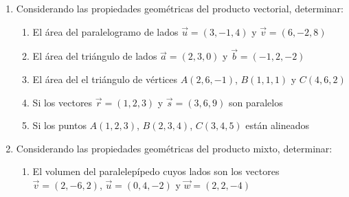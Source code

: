 \documentclass[a4paper]{article}
\newcommand{\exercise}{\item}
\newcommand{\SEL}[1]{ \left\{\begin{matrix} #1 \end{matrix}\right. }
\newcommand{\df}[2]{\displaystyle\frac{#1}{#2}}
\newcommand{\vect}[1]{\overrightarrow{#1}}
\newcommand{\degs}{^{\circ}}
\begin{document}
\begin{enumerate}
\begin{enumerate} [label=(\alph*)]
		\item La proyección vectorial y el componente ortogonal de $(-1,3)$ en la dirección de $(5,-1)$
		\item La proyección vectorial y el componente ortogonal de $\vec{r}=(-1,3)$ sobre $\vec{s}=(3,1)$
		\item La proyección vectorial y escalar de $\vec{v}=(1,5,1)$ en la dirección de $\vec{u}=(-1,2,3)$
		\item La proyección escalar y el módulo del componente ortogonal $\vect{F}=(7,-13)$ sobre $\check{\imath}$
		\item La proyección vectorial de $\vec{a} \in \mathbb{R}^2: \SEL{|\vec{a}|=9 \\ \theta=120\degs}$ sobre $\vec{b} \in \mathbb{R}^2: \SEL{|\vec{b}|=5 \\ \theta=0\degs}$
		\item La proyección vectorial, escalar, el componente ortogonal y su módulo del vector $\vec{v}=(1,2,3)$ en la dirección del vector $\vect{AB}$, con $A(0,-1,4)$ y $B(2,2,3)$
		\item La proyección vectorial y escalar de $\vec{v}=(6,2)$ en la dirección de la recta $y=\df{1}{3}x+5$
		\item La proyección vectorial y su módulo del vector $\vect{AB}$ en la dirección de $\vect{AC}$ considerando $A(-1,3)$, $B(1,2)$ y $C(5,4)$.
	\end{enumerate}
	\exercise Considerando las propiedades geométricas del producto vectorial, determinar:
	\begin{enumerate} [label=(\alph*)]
		\item El área del paralelogramo de lados $\vec{u}=(3,-1,4)$ y $\vec{v}=(6,-2,8)$
		\item El área del triángulo de lados $\vec{a}=(2,3,0)$ y $\vec{b}=(-1,2,-2)$
		\item El área del el triángulo de vértices $A(2,6,-1)$, $B(1,1,1)$ y $C(4,6,2)$
		\item Si los vectores $\vec{r}=(1,2,3)$ y $\vec{s}=(3,6,9)$ son paralelos 
		\item Si los puntos $A(1,2,3)$, $B(2,3,4)$, $C(3,4,5)$ están alineados
	\end{enumerate}
	\exercise Considerando las propiedades geométricas del producto mixto, determinar:
	\begin{enumerate} [label=(\alph*)]
		\item El volumen del paralelepípedo  cuyos lados son los vectores $\vec{v}=(2,-6,2)$, $\vec{u}=(0,4,-2)$ y $\vec{w}=(2,2,-4)$

\end{enumerate}
\end{enumerate}
\end{document}
